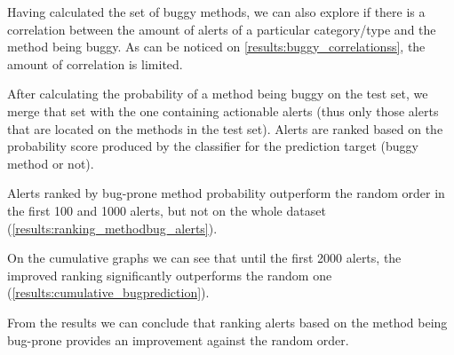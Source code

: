 Having calculated the set of buggy methods, we can also explore if there is a correlation between the amount of alerts of a particular category/type and the method being buggy. As can be noticed on \cref{results:buggy_correlationss}, the amount of correlation is limited. 

After calculating the probability of a method being buggy on the test set, we merge that set with the one containing actionable alerts (thus only those alerts that are located on the methods in the test set). Alerts are ranked based on the probability score produced by the classifier for the prediction target (buggy method or not). %

Alerts ranked by bug-prone method probability outperform the random order in the first 100 and 1000 alerts, but not on the whole dataset (\cref{results:ranking_methodbug_alerts}).

On the cumulative graphs we can see that until the first 2000 alerts, the improved ranking significantly outperforms the random one (\cref{results:cumulative_bugprediction}).

From the results we can conclude that ranking alerts based on the method being bug-prone provides an improvement against the random order.

